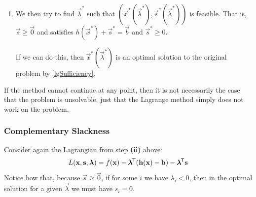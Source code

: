 \documentclass[../main.tex]{subfiles}
\begin{document}
\begin{enumerate}
    In \cref{basicLGEx}, this was $\vec{x}^{*}(\vec{\lambda}) = (-1/\lambda_1, -1/\lambda_1, x_3)$ for some fixed $x_3$.
  \item We then try to find $\vec{\lambda}^{*}$ such that $(\vec{x}^{*}(\vec{\lambda}^{*}), \vec{s}^{*}(\vec{\lambda}^{*}))$ is feasible.
    That is, $\vec{s} \geq \vec{0}$ and satisfies $h(\vec{x}^{*}) + \vec{s}^{*} = \vec{b}$ and $\vec{s}^{*} \geq 0$.

    If we can do this, then $\vec{x}^{*}(\vec{\lambda}^{*})$ is an optimal solution to the original problem by \cref{lgSufficiency}.
\end{enumerate}
If the method cannot continue at any point, then it is not necessarily the case that the problem is unsolvable, just that the Lagrange method simply does not work on the problem.
\subsubsection{Complementary Slackness} \label{complementarySlackness}
Consider again the Lagrangian from step \textbf{(ii)} above:
\[
  L(\mathbf{\bm{x}}, \mathbf{\bm{s}}, \mathbf{\bm{\lambda}}) = f(\mathbf{\bm{x}}) - \mathbf{\bm{\lambda}}^{{\mkern-1.5mu\mathsf{T}}}(\mathbf{\bm{h}}(\mathbf{\bm{x}}) - \mathbf{\bm{b}}) - \mathbf{\bm{\lambda}}^{{\mkern-1.5mu\mathsf{T}}} \mathbf{\bm{s}}
\]
Notice how that, because $\vec{s} \geq \vec{0}$, if for some $i$ we have $\lambda_i < 0$, then in the optimal solution for a given $\vec{\lambda}$ we must have $s_i = 0$.
\end{document}
